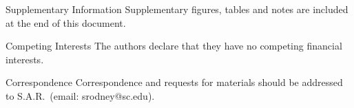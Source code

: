 \documentclass{nature_arxiv}
\begin{document}
\maketitle

\vspace{10pt}

\vspace{10pt}

\makeaffil


%







%  
%  
%  
%  
%  
%  
%  
%  
%  
%  
%  



\begin{addendum}
 \item[Supplementary Information] Supplementary figures, tables and notes are included at the end of this document.
 \item 
 \item[Competing Interests] The authors declare that they have no competing financial interests.
 \item[Correspondence] Correspondence and requests for materials
should be addressed to S.A.R.~(email: srodney@sc.edu).
\end{addendum}


{}
%



% 
% 
% 
\end{document}
